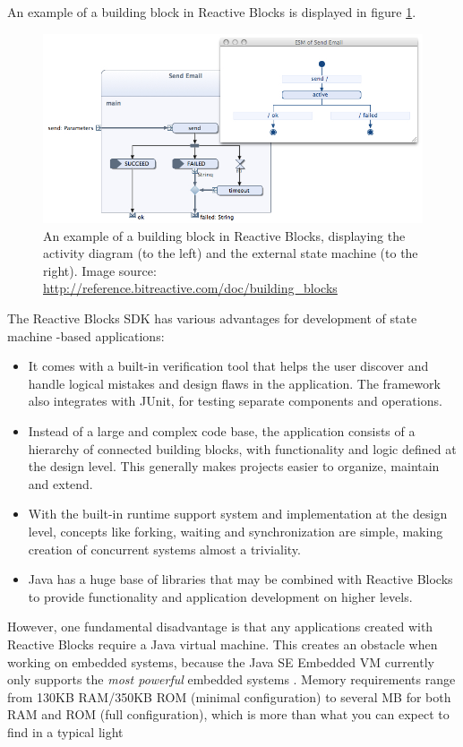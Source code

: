 An example of a building block in Reactive Blocks is displayed in figure \ref{figure:reactive_blocks}.

\begin{figure}[h]
	\centering
	\includegraphics[scale=0.5]{img/reactive_blocks.png}
	\caption[A building block in Reactive Blocks]{An example of a building block in Reactive Blocks, displaying the activity diagram (to the left) and the external state machine (to the right). Image source: \url{http://reference.bitreactive.com/doc/building_blocks} \label{figure:reactive_blocks} }
\end{figure}

The Reactive Blocks SDK has various advantages for development of state machine -based applications:
\begin{itemize}
	\item It comes with a built-in verification tool that helps the user discover and handle logical mistakes and design flaws in the application. The framework also integrates with JUnit, for testing separate components and operations.
	\item Instead of a large and complex code base, the application consists of a hierarchy of connected building blocks, with functionality and logic defined at the design level. This generally makes projects easier to organize, maintain and extend.
	\item With the built-in runtime support system and implementation at the design level, concepts like forking, waiting and synchronization are simple, making creation of concurrent systems almost a triviality.
	\item Java has a huge base of libraries that may be combined with Reactive Blocks to provide functionality and application development on higher levels.
\end{itemize}

However, one fundamental disadvantage is that any applications created with Reactive Blocks require a Java virtual machine. This creates an obstacle when working on embedded systems, because the Java SE Embedded VM currently only supports the \textit{most powerful} embedded systems \cite{website:java_embedded_vm}. Memory requirements range from 130KB RAM/350KB ROM (minimal configuration) to several MB for both RAM and ROM (full configuration), which is more than what you can expect to find in a typical light

